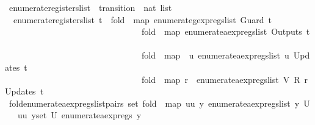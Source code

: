 \begin{isabellebody}
\isanewline
{}\isamarkupfalse%
\ enumerate{\isacharunderscore}registers{\isacharunderscore}list\ {\isacharcolon}{\isacharcolon}\ {\isachardoublequoteopen}transition\ {\isasymRightarrow}\ nat\ list{\isachardoublequoteclose}\ \isanewline
\ \ {\isachardoublequoteopen}enumerate{\isacharunderscore}registers{\isacharunderscore}list\ t\ {\isacharequal}\ {\isacharparenleft}fold\ {\isacharparenleft}{\isacharat}{\isacharparenright}\ {\isacharparenleft}map\ enumerate{\isacharunderscore}gexp{\isacharunderscore}regs{\isacharunderscore}list\ {\isacharparenleft}Guard\ t{\isacharparenright}{\isacharparenright}\ {\isacharbrackleft}{\isacharbrackright}{\isacharparenright}\ {\isacharat}\isanewline
\ \ \ \ \ \ \ \ \ \ \ \ \ \ \ \ \ \ \ \ \ \ \ \ \ \ \ \ \ \ \ \ {\isacharparenleft}fold\ {\isacharparenleft}{\isacharat}{\isacharparenright}\ {\isacharparenleft}map\ enumerate{\isacharunderscore}aexp{\isacharunderscore}regs{\isacharunderscore}list\ {\isacharparenleft}Outputs\ t{\isacharparenright}{\isacharparenright}\ {\isacharbrackleft}{\isacharbrackright}{\isacharparenright}\ {\isacharat}\isanewline
\ \ \ \ \ \ \ \ \ \ \ \ \ \ \ \ \ \ \ \ \ \ \ \ \ \ \ \ \ \ \ \ {\isacharparenleft}fold\ {\isacharparenleft}{\isacharat}{\isacharparenright}\ {\isacharparenleft}map\ {\isacharparenleft}{\isasymlambda}{\isacharparenleft}{\isacharunderscore}{\isacharcomma}\ u{\isacharparenright}{\isachardot}\ enumerate{\isacharunderscore}aexp{\isacharunderscore}regs{\isacharunderscore}list\ u{\isacharparenright}\ {\isacharparenleft}Updates\ t{\isacharparenright}{\isacharparenright}\ {\isacharbrackleft}{\isacharbrackright}{\isacharparenright}\ {\isacharat}\isanewline
\ \ \ \ \ \ \ \ \ \ \ \ \ \ \ \ \ \ \ \ \ \ \ \ \ \ \ \ \ \ \ \ {\isacharparenleft}fold\ {\isacharparenleft}{\isacharat}{\isacharparenright}\ {\isacharparenleft}map\ {\isacharparenleft}{\isasymlambda}{\isacharparenleft}r{\isacharcomma}\ {\isacharunderscore}{\isacharparenright}{\isachardot}\ enumerate{\isacharunderscore}aexp{\isacharunderscore}regs{\isacharunderscore}list\ {\isacharparenleft}V\ {\isacharparenleft}R\ r{\isacharparenright}{\isacharparenright}{\isacharparenright}\ {\isacharparenleft}Updates\ t{\isacharparenright}{\isacharparenright}\ {\isacharbrackleft}{\isacharbrackright}{\isacharparenright}{\isachardoublequoteclose}\isanewline
\isanewline
{}\isamarkupfalse%
\ fold{\isacharunderscore}enumerate{\isacharunderscore}aexp{\isacharunderscore}regs{\isacharunderscore}list{\isacharunderscore}pairs{\isacharcolon}\ {\isachardoublequoteopen}set\ {\isacharparenleft}fold\ {\isacharparenleft}{\isacharat}{\isacharparenright}\ {\isacharparenleft}map\ {\isacharparenleft}{\isasymlambda}{\isacharparenleft}uu{\isacharcomma}\ y{\isacharparenright}{\isachardot}\ enumerate{\isacharunderscore}aexp{\isacharunderscore}regs{\isacharunderscore}list\ y{\isacharparenright}\ U{\isacharparenright}\ {\isacharbrackleft}{\isacharbrackright}{\isacharparenright}\ {\isacharequal}\ {\isacharparenleft}{\isasymUnion}{\isacharparenleft}uu{\isacharcomma}\ y{\isacharparenright}{\isasymin}set\ U{\isachardot}\ enumerate{\isacharunderscore}aexp{\isacharunderscore}regs\ y{\isacharparenright}{\isachardoublequoteclose}\isanewline

\end{isabellebody}
